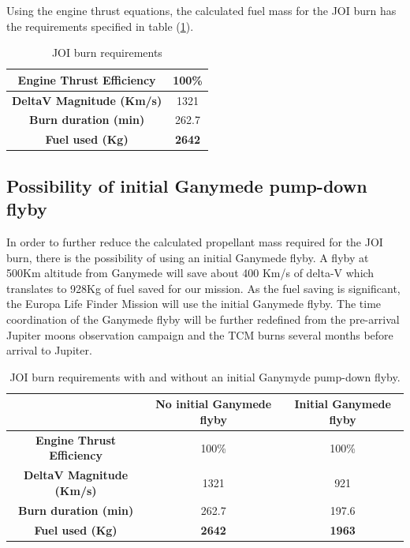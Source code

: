 Using the engine thrust equations, the calculated fuel mass for the JOI burn has the requirements specified in table (\ref{tab:joi_burn_req}).

\begin{table}[htb!]
  \centering
    \begin{tabular}{|c|c|}
    \hline
    \textbf{Engine Thrust Efficiency} & 100\% \bigstrut\\
    \hline
    \textbf{DeltaV Magnitude (Km/s)} & 1321\bigstrut\\
    \hline
    \textbf{Burn duration (min)} & 262.7\bigstrut\\
    \hline
    \textbf{Fuel used (Kg)} & \textbf{2642}\bigstrut\\
    \hline
    \end{tabular}%
    \caption{JOI burn requirements}
  \label{tab:joi_burn_req}%
\end{table}%

\subsection*{Possibility of initial Ganymede pump-down flyby}
In order to further reduce the calculated propellant mass required for the JOI burn, there is the possibility of using an initial Ganymede flyby. A flyby at 500Km altitude from Ganymede will save about 400 Km/s of delta-V \cite{clipper} which translates to 928Kg of fuel saved for our mission. As the fuel saving is significant, the Europa Life Finder Mission will use the initial Ganymede flyby. The time coordination of the Ganymede flyby will be further redefined from the pre-arrival Jupiter moons observation campaign and the TCM burns several months before arrival to Jupiter.

\begin{table}[htb!]
  \centering
    \begin{tabular}{|c|c|c|}
    \hline
    \textbf{} & No initial Ganymede flyby & Initial Ganymede flyby \bigstrut\\
    \hline
    \textbf{Engine Thrust Efficiency} & 100\% & 100\% \bigstrut\\
    \hline
    \textbf{DeltaV Magnitude (Km/s)} & 1321  & 921 \bigstrut\\
    \hline
    \textbf{Burn duration (min)} & 262.7 & 197.6 \bigstrut\\
    \hline
    \textbf{Fuel used (Kg)} & \textbf{2642} & \textbf{1963} \bigstrut\\
    \hline
    \end{tabular}%
    \caption{JOI burn requirements with and without an initial Ganymyde pump-down flyby.}
  \label{tab:joi_burn}%
\end{table}%

